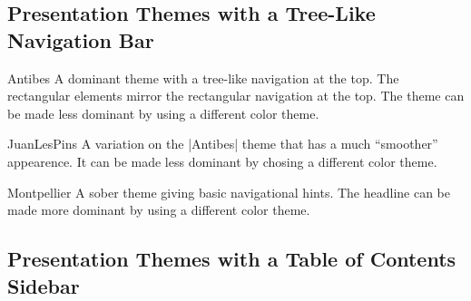 \subsection{Presentation Themes with a Tree-Like Navigation Bar}

\begin{themeexample}{Antibes}
  A dominant theme with a tree-like navigation at the top. The 
  rectangular elements mirror the rectangular navigation at the
  top. The theme can be made less dominant by using a different color
  theme. 
\end{themeexample}

\begin{themeexample}{JuanLesPins}
  A variation on the |Antibes| theme that has a much ``smoother''
  appearence. It can be made less dominant by chosing a different
  color theme.
\end{themeexample}


\begin{themeexample}{Montpellier}
  A sober theme giving basic navigational hints. The headline can be
  made more dominant by using a different color theme.
\end{themeexample}



\subsection{Presentation Themes with a Table of Contents Sidebar}

